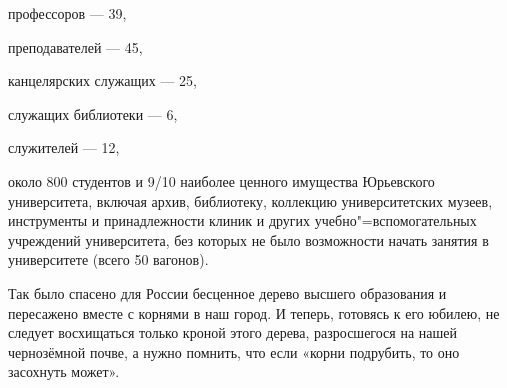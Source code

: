 профессоров — 39,

преподавателей — 45,

канцелярских служащих — 25,

служащих библиотеки — 6,

служителей — 12,

около 800 студентов и 9/10 наиболее ценного имущества Юрьевского университета,
включая архив, библиотеку, коллекцию университетских музеев, инструменты и при\-на\-д\-ле\-ж\-но\-с\-ти клиник и других учебно"=вспомогательных учреждений университета, без которых не было возможности начать занятия в университете (всего 50 вагонов).

Так было спасено для России бесценное дерево высшего образования и пересажено вместе с корнями в наш город. И теперь, готовясь к его юбилею, не следует восхищаться только кроной этого дерева, разросшегося на нашей чернозёмной почве, а нужно помнить, что если «корни подрубить, то оно засохнуть может».
